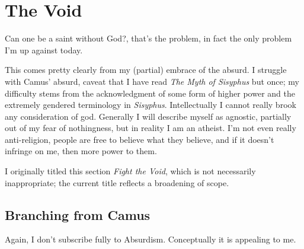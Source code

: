 \documentclass[../butidigress.tex]{subfiles}
\begin{document}
\chapter{The Void}  %
\epigraph{Can one be a saint without God?, that's the problem, in fact the only problem I'm up against today.}{}
\newpage
This comes pretty clearly from my (partial) embrace of the absurd.
I struggle with Camus' absurd, caveat that I have read \textit{The Myth of Sisyphus} but once; my difficulty stems from the acknowledgment of some form of higher power and the extremely gendered terminology in \textit{Sisyphus}.
Intellectually I cannot really brook any consideration of god.
Generally I will describe myself as agnostic, partially out of my fear of nothingness, but in reality I am an atheist.
I'm not even really anti-religion, people are free to believe what they believe, and if it doesn't infringe on me, then more power to them.

I originally titled this section \textit{Fight the Void}, which is not necessarily inappropriate; the current title reflects a broadening of scope.

\section{Branching from Camus}
Again, I don't subscribe fully to Absurdism.
Conceptually it is appealing to me.
\end{document}
